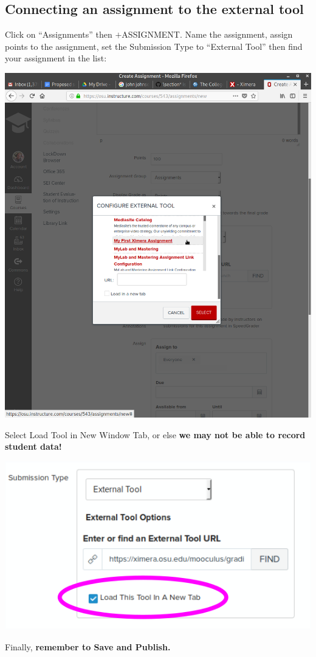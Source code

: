 \documentclass{ximera}
\begin{document}
\subsection{Connecting an  assignment to the external tool}

Click on ``Assignments'' then $+$ASSIGNMENT. Name the assignment, assign points to the assignment, 
set the Submission Type to ``External Tool'' then find your assignment in the list:
\begin{image}
  \includegraphics{canvas5.png}
\end{image}
\begin{warning}
Select Load Tool in New Window Tab, or else \textbf{we may not be able to record student data!}
\begin{image}
  \includegraphics{canvas6.png}
\end{image}
\end{warning}
Finally, \textbf{remember to Save and Publish.}
\end{document}
